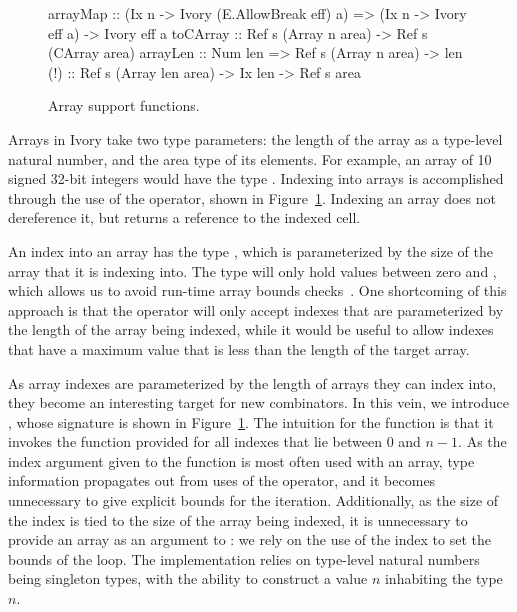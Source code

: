 \begin{figure}[ht]
\begin{code}
arrayMap :: (Ix n -> Ivory (E.AllowBreak eff) a)
         => (Ix n -> Ivory eff a) -> Ivory eff a
toCArray :: Ref s (Array n area) -> Ref s (CArray area)
arrayLen :: Num len => Ref s (Array n area) -> len
(!)      :: Ref s (Array len area) -> Ix len -> Ref s area
\end{code}
\caption{Array support functions.}
\label{array-support-functions}
\end{figure}

Arrays in Ivory take two type parameters: the length of the array as a
type-level natural number, and the area type of its elements.  For example, an
array of 10 signed 32-bit integers would have the type .  Indexing into arrays is accomplished through the use of the \cd{(!)}
operator, shown in Figure~\ref{array-support-functions}. Indexing an array does
not dereference it, but returns a reference to the indexed cell.

An index into an array has the type , which is parameterized by the size
of the array that it is indexing into.  The  type will only hold
values between zero and , which allows us to avoid run-time array bounds
checks~\cite{memareas}.  One shortcoming of this approach is that the
\cd{(!)} operator will only accept indexes that are parameterized by the length
of the array being indexed, while it would be useful to allow indexes that have
a maximum value that is less than the length of the target array.

As array indexes are parameterized by the length of arrays they can index into,
they become an interesting target for new combinators.  In this vein, we
introduce , whose signature is shown in
Figure~\ref{array-support-functions}.  The intuition for the 
function is that it invokes the function provided for all indexes that lie
between $0$ and $n - 1$.  As the index argument given to the function is most
often used with an array, type information propagates out from uses of the
\cd{(!)} operator, and it becomes unnecessary to give explicit bounds for the
iteration. Additionally, as the size of the index is tied to the size of the
array being indexed, it is unnecessary to provide an array as an argument to
: we rely on the use of the index to set the bounds of the
loop. The implementation relies on type-level natural numbers being singleton
types, with the ability to construct a value $n$ inhabiting the type $n$.

